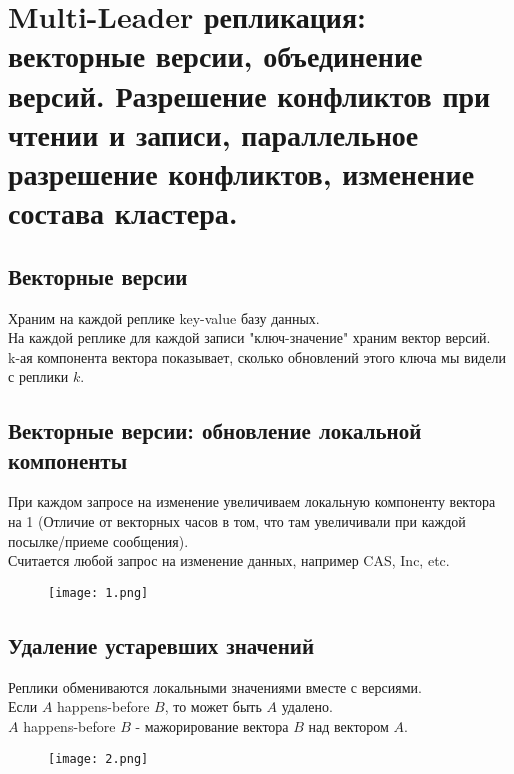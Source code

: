 \section{Multi-Leader репликация: векторные версии, объединение версий. Разрешение конфликтов при чтении и записи, параллельное разрешение конфликтов, изменение состава кластера.}

\subsection{Векторные версии}
Храним на каждой реплике key-value базу данных. \\
На каждой реплике для каждой записи "ключ-значение" храним вектор
версий. \\
k-ая компонента вектора показывает, сколько обновлений этого ключа мы видели с реплики $k$.
\subsection{Векторные версии: обновление локальной компоненты}
При каждом запросе на изменение увеличиваем локальную компоненту вектора на 1 (Отличие от векторных часов в том, что там увеличивали при каждой посылке/приеме сообщения). \\
Считается любой запрос на изменение данных, например CAS, Inc, etc.\\
\begin{figure}[h]
    \centering
    \texttt{[image: 1.png]}
    \caption{}
\end{figure}
\subsection{Удаление устаревших значений}
Реплики обмениваются локальными значениями вместе с версиями. \\
Если $A$ happens-before $B$, то может быть $A$ удалено. \\
$A$ happens-before $B$ - мажорирование вектора $B$ над вектором $A$.\\
\begin{figure}[h]
    \centering
    \texttt{[image: 2.png]}
    \caption{}
\end{figure}
